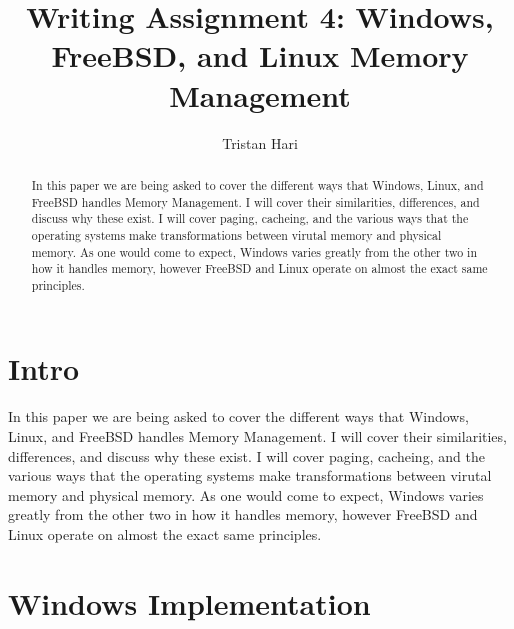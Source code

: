 \documentclass[10pt,draftclsnofoot,onecolumn]{IEEEtran}
\begin{document}
\title{Writing Assignment 4: Windows, FreeBSD, and Linux Memory Management}
\author{Tristan Hari}
\maketitle
\begin{abstract}
In this paper we are being asked to cover the different ways that Windows, Linux,
and FreeBSD handles Memory Management. I will cover their similarities,
differences, and discuss why these exist. I will cover paging, cacheing, and the
various ways that the operating systems make transformations between virutal
memory and physical memory. As one would come to expect, Windows varies greatly
from the other two in how it handles memory, however FreeBSD and Linux operate
on almost the exact same principles.
\end{abstract}
\IEEEpeerreviewmaketitle

\newpage
{}

\section{Intro}
In this paper we are being asked to cover the different ways that Windows, Linux,
and FreeBSD handles Memory Management. I will cover their similarities,
differences, and discuss why these exist. I will cover paging, cacheing, and the
various ways that the operating systems make transformations between virutal
memory and physical memory. As one would come to expect, Windows varies greatly
from the other two in how it handles memory, however FreeBSD and Linux operate
on almost the exact same principles.

\newpage


\section{Windows Implementation}
\end{document}
